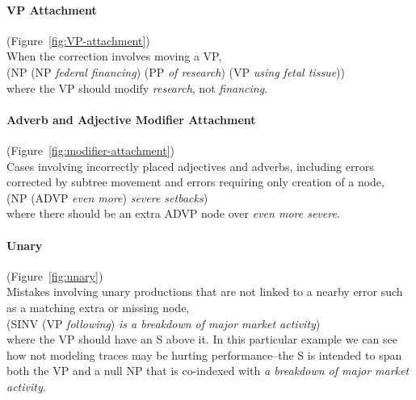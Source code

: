 \begin{figure}
\centering

\end{figure}

\paragraph{VP Attachment} (Figure~\ref{fig:VP-attachment}) \\
When the correction involves moving a VP, \myeg \\
(NP (NP \emph{federal financing}) (PP \emph{of research}) (VP \emph{using fetal tissue})) \\
where the VP should modify \emph{research}, not \emph{financing}.

\paragraph{Adverb and Adjective Modifier Attachment} (Figure~\ref{fig:modifier-attachment}) \\
Cases involving incorrectly placed adjectives and adverbs, including errors corrected by subtree movement and errors requiring only creation of a node, \myeg \\
(NP (ADVP \emph{even more}) \emph{severe setbacks}) \\
where there should be an extra ADVP node over \emph{even more severe}.

\paragraph{Unary} (Figure~\ref{fig:unary}) \\
Mistakes involving unary productions that are not linked to a nearby error such as a matching extra or missing node, \myeg \\
(SINV (VP \emph{following}) \emph{is a breakdown of major market activity}) \\
where the VP should have an S above it.
In this particular example we can see how not modeling traces may be hurting performance--the S is intended to span both the VP and a null NP that is co-indexed with \emph{a breakdown of major market activity}.

\begin{landscape}
\begin{figure}
\centering
\begin{minipage}[b]{3in}

\end{minipage}\hfill
\begin{minipage}[b]{5in}
\centering

\end{minipage}
\end{figure}
\end{landscape}

